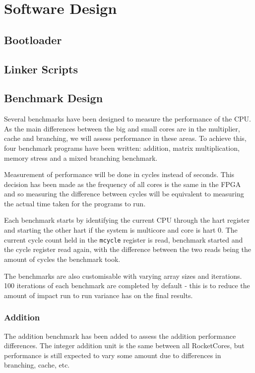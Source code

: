 \chapter{Software Design}
\label{ch:software_design}
\section{Bootloader}
\section{Linker Scripts}
\section{Benchmark Design}
Several benchmarks have been designed to measure the performance of the CPU. As the main differences between the big and small cores are in the multiplier, cache and branching, we will assess performance in these areas. To achieve this, four benchmark programs have been written: addition, matrix multiplication, memory stress and a mixed branching benchmark.

Measurement of performance will be done in cycles instead of seconds. This decision has been made as the frequency of all cores is the same in the FPGA and so measuring the difference between cycles will be equivalent to measuring the actual time taken for the programs to run.

Each benchmark starts by identifying the current CPU through the hart register and starting the other hart if the system is multicore and core is hart 0. The current cycle count held in the \texttt{mcycle} register is read, benchmark started and the cycle register read again, with the difference between the two reads being the amount of cycles the benchmark took.

The benchmarks are also customisable with varying array sizes and iterations. 100 iterations of each benchmark are completed by default - this is to reduce the amount of impact run to run variance has on the final results.

\subsection{Addition}
The addition benchmark has been added to assess the addition performance differences. The integer addition unit is the same between all RocketCores, but performance is still expected to vary some amount due to differences in branching, cache, etc. 


